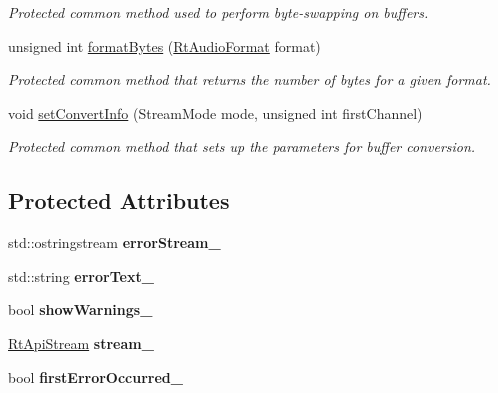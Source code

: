 \begin{DoxyCompactItemize}
\begin{DoxyCompactList}\small\item\em Protected common method used to perform byte-\/swapping on buffers. \end{DoxyCompactList}\item 
unsigned int \hyperlink{class_rt_api_a61fd2ec8b7bb72580bcf0233fd150f5f}{format\+Bytes} (\hyperlink{_rt_audio_8h_aafca92882d25915560018873221e44b8}{Rt\+Audio\+Format} format)\hypertarget{class_rt_api_a61fd2ec8b7bb72580bcf0233fd150f5f}{}\label{class_rt_api_a61fd2ec8b7bb72580bcf0233fd150f5f}

\begin{DoxyCompactList}\small\item\em Protected common method that returns the number of bytes for a given format. \end{DoxyCompactList}\item 
void \hyperlink{class_rt_api_af06289f7963ccc23dcd64eab911b26cd}{set\+Convert\+Info} (Stream\+Mode mode, unsigned int first\+Channel)\hypertarget{class_rt_api_af06289f7963ccc23dcd64eab911b26cd}{}\label{class_rt_api_af06289f7963ccc23dcd64eab911b26cd}

\begin{DoxyCompactList}\small\item\em Protected common method that sets up the parameters for buffer conversion. \end{DoxyCompactList}\end{DoxyCompactItemize}
\subsection*{Protected Attributes}
\begin{DoxyCompactItemize}
\item 
std\+::ostringstream {\bfseries error\+Stream\+\_\+}\hypertarget{class_rt_api_a3498df7d2f954d691d52c75f29dd8873}{}\label{class_rt_api_a3498df7d2f954d691d52c75f29dd8873}

\item 
std\+::string {\bfseries error\+Text\+\_\+}\hypertarget{class_rt_api_ab512557e93839a7cbb997160b08d3c18}{}\label{class_rt_api_ab512557e93839a7cbb997160b08d3c18}

\item 
bool {\bfseries show\+Warnings\+\_\+}\hypertarget{class_rt_api_aa9142cb3f4df970af4ee37fedb2f16b1}{}\label{class_rt_api_aa9142cb3f4df970af4ee37fedb2f16b1}

\item 
\hyperlink{struct_rt_api_1_1_rt_api_stream}{Rt\+Api\+Stream} {\bfseries stream\+\_\+}\hypertarget{class_rt_api_a818637ca9005b0270d56eaaea4697b34}{}\label{class_rt_api_a818637ca9005b0270d56eaaea4697b34}

\item 
bool {\bfseries first\+Error\+Occurred\+\_\+}\hypertarget{class_rt_api_a27b79744725ac8f8f56d2de8868fa242}{}\label{class_rt_api_a27b79744725ac8f8f56d2de8868fa242}

\end{DoxyCompactItemize}
